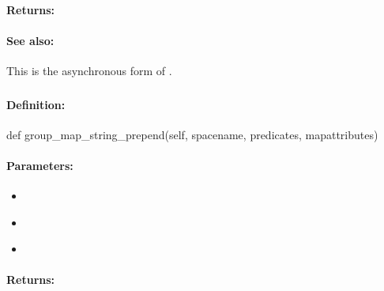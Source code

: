 \paragraph{Returns:}


\paragraph{See also:}  This is the asynchronous form of .

\pagebreak
\subsubsection{}
\label{api:python:group_map_string_prepend}


\paragraph{Definition:}
\begin{pythoncode}
def group_map_string_prepend(self, spacename, predicates, mapattributes)
\end{pythoncode}

\paragraph{Parameters:}
\begin{itemize}[noitemsep]
\item {}\\

\item {}\\

\item {}\\

\end{itemize}

\paragraph{Returns:}


